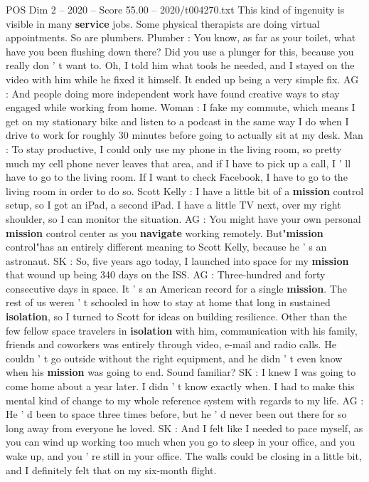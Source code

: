 \begin{textsample}{POS Dim 2 – 2020 – Score 55.00 – 2020/t004270.txt}
This kind of ingenuity is visible in many \textbf{service} jobs.
Some physical therapists are doing virtual appointments.
So are plumbers.
Plumber : You know, as far as your toilet, what have you been flushing down there?
Did you use a plunger for this, because you really don ' t want to.
Oh, I told him what tools he needed, and I stayed on the video with him while he fixed it himself.
It ended up being a very simple fix.
AG : And people doing more independent work have found creative ways to stay engaged while working from home.
Woman : I fake my commute, which means I get on my stationary bike and listen to a podcast in the same way I do when I drive to work for roughly 30 minutes before going to actually sit at my desk.
Man : To stay productive, I could only use my phone in the living room, so pretty much my cell phone never leaves that area, and if I have to pick up a call, I ' ll have to go to the living room.
If I want to check Facebook, I have to go to the living room in order to do so.
Scott Kelly : I have a little bit of a \textbf{mission} control setup, so I got an iPad, a second iPad.
I have a little TV next, over my right shoulder, so I can monitor the situation.
AG : You might have your own personal \textbf{mission} control center as you \textbf{navigate} working remotely.
But"\textbf{mission} control"has an entirely different meaning to Scott Kelly, because he ' s an astronaut.
SK : So, five years ago today, I launched into space for my \textbf{mission} that wound up being 340 days on the ISS.
AG : Three-hundred and forty consecutive days in space.
It ' s an American record for a single \textbf{mission}.
The rest of us weren ' t schooled in how to stay at home that long in sustained \textbf{isolation}, so I turned to Scott for ideas on building resilience.
Other than the few fellow space travelers in \textbf{isolation} with him, communication with his family, friends and coworkers was entirely through video, e-mail and radio calls.
He couldn ' t go outside without the right equipment, and he didn ' t even know when his \textbf{mission} was going to end.
Sound familiar?
SK : I knew I was going to come home about a year later.
I didn ' t know exactly when.
I had to make this mental kind of change to my whole reference system with regards to my life.
AG : He ' d been to space three times before, but he ' d never been out there for so long away from everyone he loved.
SK : And I felt like I needed to pace myself, as you can wind up working too much when you go to sleep in your office, and you wake up, and you ' re still in your office.
The walls could be closing in a little bit, and I definitely felt that on my six-month flight.

\end{textsample}
